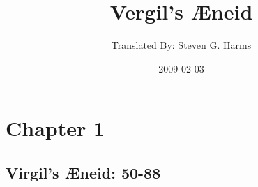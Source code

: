 \documentclass[]{book}
\title{Vergil's {\AE}neid}
\author{ Translated By:  Steven G. Harms }
\date{2009-02-03}
\begin{document}

\ifpdf
{}
\else
{}
\fi

\enumstyle 

\maketitle
\tableofcontents

\chapter{Chapter 1}
%
%
%

\newpage
\section{Virgil's {\AE}neid:  50-88} %
\end{document}
